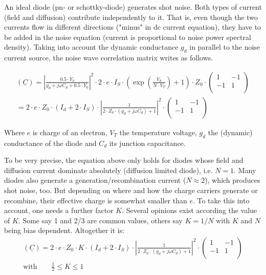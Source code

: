 \documentclass[10pt]{report}
\begin{document}
An ideal diode (pn- or schottky-diode) generates shot noise.  Both
types of current (field and diffusion) contribute independently to it.
That is, even though the two currents flow in different directions
("minus" in dc current equation), they have to be added in the noise
equation (current is proportional to noise power spectral density).
Taking into account the dynamic conductance $g_d$ in parallel to the
noise current source, the noise wave correlation matrix writes as
follows.

\begin{equation}
\begin{split}
(\underline{C})
 =  \left| \frac{0.5\cdot Y_0}{g_d+j\omega C_d + 0.5\cdot Y_0}\right|^2  \cdot 2\cdot e\cdot I_S\cdot
    \left( \exp\left( \frac{V_{d}}{N\cdot V_T} \right) +1 \right) \cdot Z_0\cdot\begin{pmatrix}
   1 & -1\\
  -1 &  1\\
\end{pmatrix} \\
 = 2\cdot e\cdot Z_0\cdot \left(I_{d} + 2\cdot I_{S}\right)\cdot
    \left| \frac{1}{2\cdot Z_0\cdot (g_d+j\omega C_d) + 1}\right|^2 \cdot
\begin{pmatrix}
   1 & -1\\
  -1 &  1\\
\end{pmatrix}
\end{split}
\end{equation}

Where $e$ is charge of an electron, $V_T$ the temperature voltage,
$g_d$ the (dynamic) conductance of the diode and $C_d$ its junction
capacitance.

\addvspace{12pt}

To be very precise, the equation above only holds for diodes whose
field and diffusion current dominate absolutely (diffusion limited
diode), i.e. $N=1$.  Many diodes also generate a
generation/recombination current ($N\approx 2$), which produces shot
noise, too.  But depending on where and how the charge carriers
generate or recombine, their effective charge is somewhat smaller than
$e$.  To take this into account, one needs a further factor $K$.
Several opinions exist according the value of $K$.  Some say 1 and 2/3
are common values, others say $K=1/N$ with $K$ and $N$ being bias
dependent.  Altogether it is:
\begin{equation}
\begin{split}
(\underline{C})
 = 2\cdot e\cdot Z_0\cdot K\cdot \left(I_{d} + 2\cdot I_{S}\right)\cdot
    \left| \frac{1}{2\cdot Z_0\cdot (g_d+j\omega C_d) + 1}\right|^2 \cdot
\begin{pmatrix}
   1 & -1\\
  -1 &  1\\
\end{pmatrix}\\
\text{with}\qquad\frac{1}{2}\le K \le 1
\end{split}
\label{eqn:diode_noise}
\end{equation}
\end{document}
